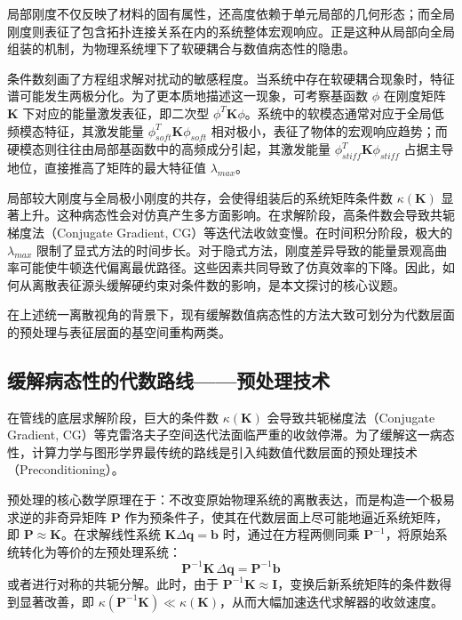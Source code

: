 局部刚度不仅反映了材料的固有属性，还高度依赖于单元局部的几何形态；而全局刚度则表征了包含拓扑连接关系在内的系统整体宏观响应。正是这种从局部向全局组装的机制，为物理系统埋下了软硬耦合与数值病态性的隐患。

条件数刻画了方程组求解对扰动的敏感程度。当系统中存在软硬耦合现象时，特征谱可能发生两极分化。为了更本质地描述这一现象，可考察基函数 $\phi$ 在刚度矩阵 $\mathbf{K}$ 下对应的能量激发表征，即二次型 $\phi^T \mathbf{K} \phi$。系统中的软模态通常对应于全局低频模态特征，其激发能量 $\phi_{soft}^T \mathbf{K} \phi_{soft}$ 相对极小，表征了物体的宏观响应趋势；而硬模态则往往由局部基函数中的高频成分引起，其激发能量 $\phi_{stiff}^T \mathbf{K} \phi_{stiff}$ 占据主导地位，直接推高了矩阵的最大特征值 $\lambda_{max}$。

局部较大刚度与全局极小刚度的共存，会使得组装后的系统矩阵条件数 $\kappa(\mathbf{K})$ 显著上升。这种病态性会对仿真产生多方面影响。在求解阶段，高条件数会导致共轭梯度法（Conjugate Gradient, CG）等迭代法收敛变慢。在时间积分阶段，极大的 $\lambda_{max}$ 限制了显式方法的时间步长。对于隐式方法，刚度差异导致的能量景观高曲率可能使牛顿迭代偏离最优路径。这些因素共同导致了仿真效率的下降。因此，如何从离散表征源头缓解硬约束对条件数的影响，是本文探讨的核心议题。

在上述统一离散视角的背景下，现有缓解数值病态性的方法大致可划分为代数层面的预处理与表征层面的基空间重构两类。

\subsection{缓解病态性的代数路线——预处理技术}

在管线的底层求解阶段，巨大的条件数 $\kappa(\mathbf{K})$ 会导致共轭梯度法（Conjugate Gradient, CG）等克雷洛夫子空间迭代法面临严重的收敛停滞。为了缓解这一病态性，计算力学与图形学界最传统的路线是引入纯数值代数层面的预处理技术（Preconditioning）。

预处理的核心数学原理在于：不改变原始物理系统的离散表达，而是构造一个极易求逆的非奇异矩阵 $\mathbf{P}$ 作为预条件子，使其在代数层面上尽可能地逼近系统矩阵，即 $\mathbf{P} \approx \mathbf{K}$。在求解线性系统 $\mathbf{K} \Delta \mathbf{q} = \mathbf{b}$ 时，通过在方程两侧同乘 $\mathbf{P}^{-1}$，将原始系统转化为等价的左预处理系统：
\begin{equation}
    \mathbf{P}^{-1} \mathbf{K} \, \Delta \mathbf{q} = \mathbf{P}^{-1} \mathbf{b}
\end{equation}
或者进行对称的共轭分解。此时，由于 $\mathbf{P}^{-1} \mathbf{K} \approx \mathbf{I}$，变换后新系统矩阵的条件数得到显著改善，即 $\kappa(\mathbf{P}^{-1}\mathbf{K}) \ll \kappa(\mathbf{K})$，从而大幅加速迭代求解器的收敛速度。

